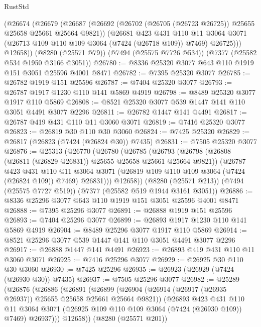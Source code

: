 \begin{lexlean}{RustStd}
\begin{coremodule}
      (@26674
        (@26679
          (@26687
            (@26692 (@26702 (@26705 (@26723 @26725)) @25655 @25658 @25661 @25664 @9821))
            (@26681
              @423
              @431
              @110
              @11
              @3064
              @3071
              (@26713 @109 @110 @109 @3064 (@7424 (@26718 @109)) @7469)
              @26725)))
        @12658))
    (@8280 (@25571 @79))
    (@7494 (@25575 @7726 @534))
    (@7377 (@25582 @534 @1950 @3166 @3051))
@26780 := @8336 @25320 @3077 @643 @110 @1919 @151 @3051 @25596 @4001 @8471
@26782 := @7395 @25320 @3077
@26785 := @26782 @1919 @151 @25596
@26787 := @7404 @25320 @3077
@26793 := @26787 @1917 @1230 @110 @141 @5869 @4919
@26798 := @8489 @25320 @3077 @1917 @110 @5869
@26808 := @8521 @25320 @3077 @539 @1447 @141 @110 @3051 @4491 @3077 @2296
@26811 := @26782 @1447 @141 @4491
@26817 := @26787 @419 @431 @110 @11 @3060 @3071
@26819 := @7416 @25320 @3077
@26823 := @26819 @30 @110 @30 @3060
@26824 := @7425 @25320
@26829 := @26817 (@26823 (@7424 (@26824 @30)) @7435)
@26831 := @7505 @25320 @3077
@26876 := @25313
    (@26770
      (@26780
        (@26785
          (@26793
            (@26798 (@26808 (@26811 (@26829 @26831)) @25655 @25658 @25661 @25664 @9821))
            (@26787
              @423
              @431
              @110
              @11
              @3064
              @3071
              (@26819 @109 @110 @109 @3064 (@7424 (@26824 @109)) @7469)
              @26831)))
        @12658))
    (@8280 (@25571 @213))
    (@7494 (@25575 @7727 @519))
    (@7377 (@25582 @519 @1944 @3161 @3051))
@26886 := @8336 @25296 @3077 @643 @110 @1919 @151 @3051 @25596 @4001 @8471
@26888 := @7395 @25296 @3077
@26891 := @26888 @1919 @151 @25596
@26893 := @7404 @25296 @3077
@26899 := @26893 @1917 @1230 @110 @141 @5869 @4919
@26904 := @8489 @25296 @3077 @1917 @110 @5869
@26914 := @8521 @25296 @3077 @539 @1447 @141 @110 @3051 @4491 @3077 @2296
@26917 := @26888 @1447 @141 @4491
@26923 := @26893 @419 @431 @110 @11 @3060 @3071
@26925 := @7416 @25296 @3077
@26929 := @26925 @30 @110 @30 @3060
@26930 := @7425 @25296
@26935 := @26923 (@26929 (@7424 (@26930 @30)) @7435)
@26937 := @7505 @25296 @3077
@26982 := @25289
    (@26876
      (@26886
        (@26891
          (@26899
            (@26904 (@26914 (@26917 (@26935 @26937)) @25655 @25658 @25661 @25664 @9821))
            (@26893
              @423
              @431
              @110
              @11
              @3064
              @3071
              (@26925 @109 @110 @109 @3064 (@7424 (@26930 @109)) @7469)
              @26937)))
        @12658))
    (@8280 (@25571 @201))

\end{coremodule}
\end{lexlean}
